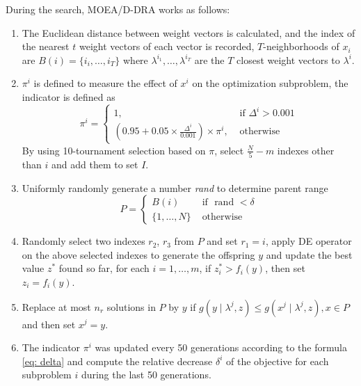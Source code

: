 \documentclass[journal]{IEEEtran}
\begin{document}
During the search, MOEA/D-DRA works as follows:
\begin{enumerate}
  \item The Euclidean distance between weight vectors is calculated, and the index of the nearest $t$ weight vectors of each vector is recorded, $T$-neighborhoods of $x_i$ are $B(i) = \{i_i,\dots , i_T\}$ where $\lambda^{i_1},\dots,\lambda^{i_T}$ are the $T$ closest weight vectors to $\lambda^i$.
  \item $\pi^i$ is defined to measure the effect of $x^i$ on the optimization subproblem, the indicator is defined as
        \begin{equation}
          \pi^{i}=\left\{\begin{array}{ll}
            1,                                                                     & \text { if } \Delta^{i}>0.001 \\
            \left(0.95+0.05 \times \frac{\Delta^{i}}{0.001}\right) \times \pi^{i}, & \text { otherwise }
          \end{array}\right.
          \label{eq: delta}
        \end{equation}
        By using 10-tournament selection based on $\pi$, select $\frac{N}{5}-m$ indexes other than $i$ and add them to set $I$.
  \item Uniformly randomly generate a number \textit{rand} to determine parent range
        \begin{equation}
          P=\left\{\begin{array}{ll}
            B(i)             & \text { if } \text { rand }<\delta \\
            \{1, \ldots, N\} & \text { otherwise }
          \end{array}\right.
        \end{equation}
  \item Randomly select two indexes $r_2$, $r_3$ from $P$ and set $r_1=i$, apply DE operator on the above selected indexes to generate the offspring $y$ and update the best value $z^*$ found so far, for each $i=1,\dots,m$, if $z_i^* > f_i(y)$, then set $z_i=f_i(y)$.
  \item Replace at most $n_r$ solutions in $P$ by $y$ if $g\left(y \mid \lambda^{j}, z\right) \leq g\left(x^{j} \mid \lambda^{j}, z\right), x \in P$ and then set $x^j=y$.
  \item The indicator $\pi^i$ was updated every 50 generations according to the formula \ref{eq: delta} and compute the relative decrease $\delta^i$ of the objective for each subproblem $i$ during the last 50 generations.
\end{enumerate}
\end{document}
